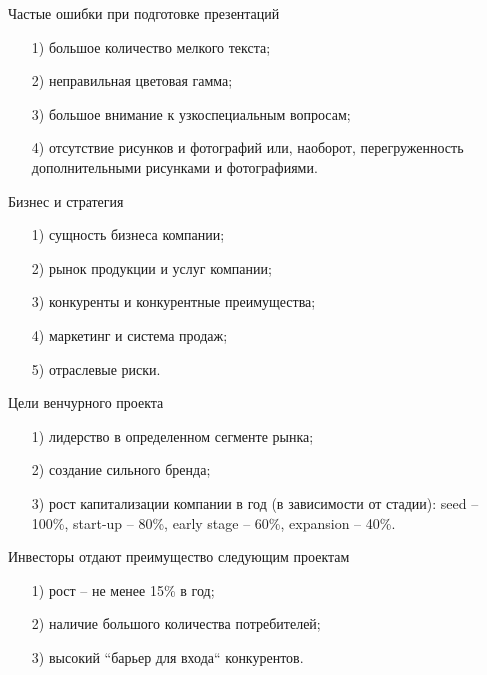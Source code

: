 \documentclass[_Venture_p2.tex]{subfiles}
\begin{document}
\begin{frame}{Частые ошибки при подготовке презентаций}
\begin{itemize}
	\item[1)] большое количество мелкого текста;
	\item[2)] неправильная цветовая гамма;
	\item[3)] большое внимание к узкоспециальным вопросам;
	\item[4)] отсутствие рисунков и фотографий или, наоборот, перегруженность дополнительными рисунками и фотографиями.
\end{itemize}
\end{frame}

\begin{frame}{Бизнес и стратегия}
\begin{itemize}
	\item[1)] сущность бизнеса компании;
	\item[2)] рынок продукции и услуг компании;
	\item[3)] конкуренты и конкурентные преимущества;
	\item[4)] маркетинг и система продаж;
	\item[5)] отраслевые риски.
\end{itemize}
\end{frame}


\begin{frame}{Цели венчурного проекта}
\begin{itemize}
	\item[1)] лидерство в определенном сегменте рынка;
	\item[2)] создание сильного бренда;
	\item[3)] рост капитализации компании в год (в зависимости от стадии): seed – 100\%, start-up – 80\%, early stage – 60\%, expansion – 40\%.
\end{itemize}
\end{frame}


\begin{frame}{Инвесторы отдают преимущество следующим проектам}
\begin{itemize}
	\item[1)] рост – не менее 15\% в год;
	\item[2)] наличие большого количества потребителей;
	\item[3)] высокий ``барьер для входа`` конкурентов.
\end{itemize}
\end{frame}
\end{document}
